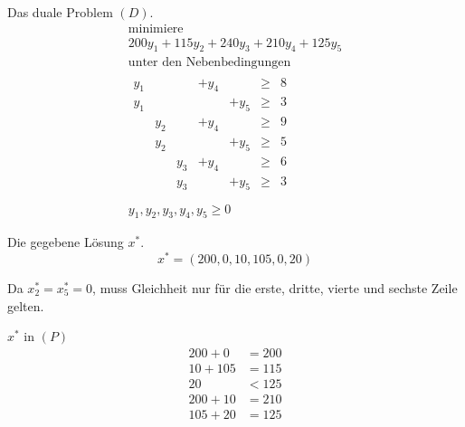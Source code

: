 \documentclass[a4paper]{scrartcl}
\begin{document}
\begin{enumerate}[label=\bfseries\arabic*.]
\begin{enumerate}
                Das duale Problem $(D)$.
                \begin{equation}
                    \begin{gathered}
                        \text{minimiere} \\
                        200y_1 +115y_2 +240y_3 + 210y_4 +125y_5 \\
                        \text{unter den Nebenbedingungen} \\
                        \begin{array}{rrrrrcr}
                            y_1 & & & +y_4 & & \geq & 8 \\
                            y_1 & & & & +y_5 & \geq & 3 \\
                            & y_2 & & +y_4 & & \geq & 9 \\
                            & y_2 & & & +y_5 & \geq & 5 \\
                            & & y_3 & +y_4 & & \geq & 6 \\
                            & & y_3 & & +y_5 & \geq & 3 \\
                        \end{array} \\
                        y_1, y_2, y_3, y_4, y_5 \geq 0
                    \end{gathered}
                \end{equation}

                Die gegebene Lösung $x^*$.
                \begin{equation}
                    x^* = \left( 200, 0, 10, 105, 0, 20 \right)
                \end{equation}

                Da $x_2^* = x_5^* = 0$, muss Gleichheit nur für die erste,
                dritte, vierte und sechste Zeile gelten.

                $x^*$ in $(P)$
                \begin{equation}
                    \begin{split}
                        200 + 0 &= 200 \\
                        10 + 105 &= 115 \\
                        20 &< 125 \\
                        200 + 10 &= 210 \\
                        105 + 20 &= 125
                    \end{split}
                \end{equation}


\end{enumerate}
\end{enumerate}
\end{document}
